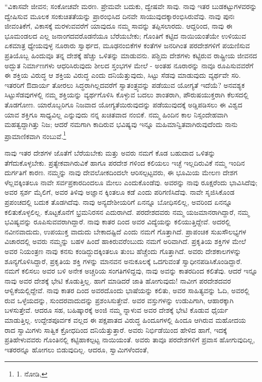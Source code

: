 “ವಿಕಾಸವೇ ಜೀವನ; ಸಂಕೋಚವೇ ಮರಣ. ಪ್ರೇಮವೇ ಬದುಕು, ದ್ವೇಷವೇ ಸಾವು. ನಾವು ಇತರ ಬುಡಕಟ್ಟುಗಳವರನ್ನು ದ್ವೇಷಿಸುವ ಮೂಲಕ ಸಂಕುಚಿತತೆಯನ್ನು ಪ್ರಾರಂಭಿಸಿದ ದಿನವೇ ಸಾಯುವುದಕ್ಕಾರಂಭಿಸಿರುವೆವು. ನಾವು ಪುನಃ ಜೀವಂತಿಕೆಗೆ, ವಿಕಾಸಕ್ಕೆ ಮರಳುವವರೆಗೆ ಯಾವುದೂ ನಮ್ಮ ಸಾವನ್ನು ತಪ್ಪಿಸಲಾರದು. ಆದ್ದರಿಂದ, ನಾವು ಈ ಭೂಮಂಡಲದ ಎಲ್ಲ ಜನಾಂಗದವರೊಡನೆಯೂ ಬೆರೆಯಬೇಕು; ಗೊಂತಿಗೆ ಕಟ್ಟಿದ ನಾಯಿಯಂತೆಯೇ ಉಳಿಯುವ ಏಕಮಾತ್ರ ಧ್ಯೇಯವುಳ್ಳ ನೂರಾರು ಸ್ವಾರ್ಥದ, ಮೂಢನಂಬಿಕೆಗಳ ಕಂತೆಗಳ ಜನರಿಗಿಂತ ಪರದೇಶಗಳಿಗೆ ಪಯಣಿಸುವ ಪ್ರತಿಯೊಬ್ಬ ಹಿಂದುವೂ ತನ್ನ ದೇಶಕ್ಕೆ ಹೆಚ್ಚು ಒಳಿತನ್ನು ಮಾಡುವನು. ಪಶ್ಚಿಮ ದೇಶಗಳು ಕಟ್ಟಿರುವ ರಾಷ್ಟ್ರೀಯ ಜೀವನದ ಅದ್ಭುತ ನಿರ್ಮಾಣಗಳು ಆಧರಿಸಿರುವುದು ಶೀಲದ ಸ್ತಂಭಗಳ ಮೇಲೆ - ಅಂತಹ ನೂರಾರನ್ನು ನಾವೂ ರೂಪಿಸುವವರೆಗೆ ಈ ಶಕ್ತಿಯ ವಿರುದ್ಧ ಆ ಶಕ್ತಿಯ ವಿರುದ್ಧ ಎಂದು ದನಿಯೆತ್ತುವುದು, ಸಿಟ್ಟು ಸೆಡವು ಮಾಡುವುದು ವ್ಯರ್ಥವೇ ಸರಿ. ಇತರರಿಗೆ ಔದಾರ್ಯ ತೋರಲು ಸಿದ್ಧರಾಗಿಲ್ಲದವರೆಗೆ ಸ್ವಾತಂತ್ರ್ಯವನ್ನು ಪಡೆಯುವ ಯೋಗ್ಯತೆ ಇದೆಯೆ? ಅನವಶ್ಯಕ ಸಿಟ್ಟುಸೆಡವುಗಳಲ್ಲಿ ನಮ್ಮ ಶಕ್ತಿಯನ್ನು ವ್ಯರ್ಥಗೊಳಿಸಿ ಕೊಳ್ಳುವ ಬದಲು ಶಾಂತರಾಗಿ, ಪೌರುಷಯುಕ್ತರಾಗಿ ಕೆಲಸದಲ್ಲಿ ತೊಡಗೋಣ. ಯಾರೊಬ್ಬರಿಗೂ ನಿಜವಾದ ಯೋಗ್ಯತೆಯಿರುವುದನ್ನು ಪಡೆಯುವುದಕ್ಕೆ ಅಡ್ಡಿಪಡಿಸಲು ಈ ವಿಶ್ವದ ಯಾವ ಶಕ್ತಿಗೂ ಸಾಧ್ಯವಿಲ್ಲ ಎನ್ನುವುದು ನನ್ನ ಖಚಿತವಾದ ನಂಬಿಕೆ. ನಮ್ಮ ಹಿಂದಿನ ಕಾಲ ನಿಸ್ಸಂದೇಹವಾಗಿ ಮಹತ್ವದ್ದಾಗಿತ್ತು ನಿಜ; ಆದರೆ ನಮಗಾಗಿ ಕಾದಿರುವ ಭವಿಷ್ಯವು ಇನ್ನೂ ಮಹಿಮಾನ್ವಿತವಾಗಿರುವುದೆಂದು ನಾನು ಪ್ರಾಮಾಣಿಕವಾಗಿ ನಂಬುವೆ.\footnote{1. ನೋಡಿ, }

ನಾವು ಇತರ ದೇಶಗಳ ಜೊತೆಗೆ ಬೆರೆಯಬೇಕು ಮತ್ತು ಅವರು ನಮಗೆ ಕೊಡ ಬಹುದಾದ ಒಳಿತನ್ನು ತೆಗೆದುಕೊಳ್ಳಬೇಕು. ಪ್ರತ್ಯೇಕವಾಗಿರುವಿಕೆ ಹಾಗೂ ಪರದೇಶ ಗಳಿಂದ ಕಲಿಯಲು ಇಚ್ಛೆ ಇಲ್ಲದಿರುವಿಕೆ ನಮ್ಮ ಇಂದಿನ ದುರ್ಗತಿಗೆ ಕಾರಣ. ನಮ್ಮನ್ನು ನಾವು ದೇವಲೋಕದಿಂದಲೇ ಆರಿಸಲ್ಪಟ್ಟವರು, ಈ ಭೂಮಿಯ ಮೇಲಣ ದೇಶಗ ಳೆಲ್ಲವಕ್ಕಿಂತಲೂ ನಾವೇ ಸರ್ವಪ್ರಕಾರದಿಂದಲೂ ಮೇಲು ಎಂದುಕೊಂಡೆವು. ಅವರನ್ನು ನಾವು ರೂಕ್ಷರೆಂದು ಭಾವಿಸಿದೆವು; ಅವರ ಸ್ಪರ್ಶ ಮೈಲಿಗೆ, ಅವರ ತಿಳಿವು ಅಜ್ಞಾನ ಕ್ಕಿಂತಲೂ ಕಡೆ ಎಂದು ಪರಿಗಣಿಸಿದೆವು. ನಾವೇ ಸೃಜಿಸಿಕೊಂಡ ಪ್ರಪಂಚದಲ್ಲಿ ಬದುಕ ತೊಡಗಿದೆವು. ನಾವು ಅನ್ಯದೇಶೀಯರಿಗೆ ಏನನ್ನೂ ಬೋಧಿಸಲಿಲ್ಲ, ಅವರಿಂದ ಏನನ್ನೂ ಕಲಿತುಕೊಳ್ಳಲಿಲ್ಲ. ಕೊಟ್ಟಕೊನೆಗೆ ಭ್ರಮನಿರಸನ ಎದುರಾಗಿದೆ. ಪರದೇಶದವರು ನಮ್ಮ ಯಜಮಾನರಾಗಿದ್ದಾರೆ, ನಮ್ಮ ಭವಿಷ್ಯವನ್ನು ರೂಪಿಸುವವರಾಗಿದ್ದಾರೆ. ನಾವು ಕಾತರ ದಿಂದ ಅವರ ವಿದ್ಯೆಯನ್ನು ಕಲಿಯುತ್ತಿದ್ದೇವೆ. ಅದರಲ್ಲಿ ನವೀನವಾದುದು, ಉಪಯುಕ್ತ ವಾದುದು ಬೇಕಾದಷ್ಟಿದೆ ಎಂದು ನಮಗೆ ಗೊತ್ತಾಗಿದೆ. ಪ್ರಾಪಂಚಿಕ ಸುಖಸೌಲಭ್ಯಗಳ ವಿಚಾರದಲ್ಲಿ ಅವರು ನಮ್ಮನ್ನು ಬಹಳ ಹಿಂದೆ ಹಾಕಿರುವರೆಂಬುದು ನಮಗೆ ಅರಿವಾಗಿದೆ. ಪ್ರಕೃತಿಯ ಶಕ್ತಿಗಳ ಮೇಲೆ ಅವರ ನಿಯಂತ್ರಣ ನಾವು ಕನಸು ಕಂಡಿದ್ದುದಕ್ಕಿಂತಲೂ ತುಂಬ ಹೆಚ್ಚೆಂದು ಗೊತ್ತಾಗಿದೆ. ಅವರು ದೇಶಕಾಲಗಳನ್ನು ಶೂನ್ಯಗೊಳಿಸಿದ್ದಾರೆ, ಪ್ರಕೃತಿಯ ಶಕ್ತಿ ಗಳನ್ನು ಮಾನವನ ಅನುಕೂಲಕ್ಕೆ ಒದಗುವಂತೆ ಸ್ವಾಧೀನಪಡಿಸಿಕೊಂಡಿದ್ದಾರೆ. ನಮಗೆ ಕಲಿಸಲು ಅವರ ಬಳಿ ಅನೇಕ ಅಚ್ಚರಿಯ ಸಂಗತಿಗಳಿದ್ದವು, ನಾವು ಅವನ್ನು ಕಾತರದಿಂದ ಕಲಿತೆವು. ಆದರೆ ಇನ್ನೂ ನಾವು ಅವರ ದೇಶಕ್ಕೆ ಭೇಟಿ ಕೊಡುತ್ತಿಲ್ಲ. ಹಾಗೆ ಮಾಡಿದರೆ ಜಾತಿ ಹೋಗುವುದು! ನಾವೀಗ ಪರದೇಶದವರ ಆಳ್ವಿಕೆಯಲ್ಲಿದ್ದೇವೆ. ನಾವು ಕಾತರ ದಿಂದ ಅವರದೊಂದು ಭಾಷೆಯನ್ನು ಕಲಿತು, ಅವರ ಸಾಹಿತ್ಯವನ್ನು ಓದಿ, ಅವರಲ್ಲಿ ರುವ ಒಳ್ಳೆಯದನ್ನು, ಸುಂದರವಾದುದನ್ನು ಪ್ರಶಂಸಿಸುತ್ತೇವೆ. ಅವರ ವಸ್ತುಗಳನ್ನು ಉಡುಪಿಗಾಗಿ, ಆಹಾರಕ್ಕಾಗಿ ಬಳಸುತ್ತೇವೆ. ಆದರೂ ಸಹ, ಬಹಿಷ್ಕಾರಕ್ಕೆ ಅಂಜಿ ನಮ್ಮ ನ್ನಾಳುವ ಅವರ ದೇಶಕ್ಕೆ ಭೇಟಿ ಕೊಡುವ ಧೈರ್ಯ ಮಾಡುತ್ತಿಲ್ಲ. ಉದ್ದೇಶಪೂರ್ವಕ ವಲ್ಲದ ಈ ಪಕ್ಷಪಾತದ ವಿರುದ್ಧ ಹಿಂದೂಗಳಲ್ಲಿ ಹಿಂದೂ ಆಗಿರುವ ಮಹೋದಯ ರಾದ ಸ್ವಾಮಿಗಳು ಸಾತ್ವಿಕ ಕ್ರೋಧದಿಂದ ದನಿಯೆತ್ತುತ್ತಾರೆ. ಅವರು ನಿರ್ಭಿಡೆಯಿಂದ ಹೇಳಿದ ಹಾಗೆ, ಇದಕ್ಕೆ ಪ್ರತಿಹೇಳುವವರು ಗೊಂತಿನಲ್ಲಿ ಕಟ್ಟಿಹಾಕಲ್ಪಟ್ಟ ನಾಯಿಯಂತೆ. ಅವರು ತಾವೂ ಪರದೇಶಗಳಿಗೆ ಪ್ರವಾಸ ಹೋಗುವುದಿಲ್ಲ, ಇತರರನ್ನೂ ಹೋಗಲು ಬಿಡುವುದಿಲ್ಲ. ಆದರೂ, ಸ್ವಾಮಿಗಳೆಂದಂತೆ,

